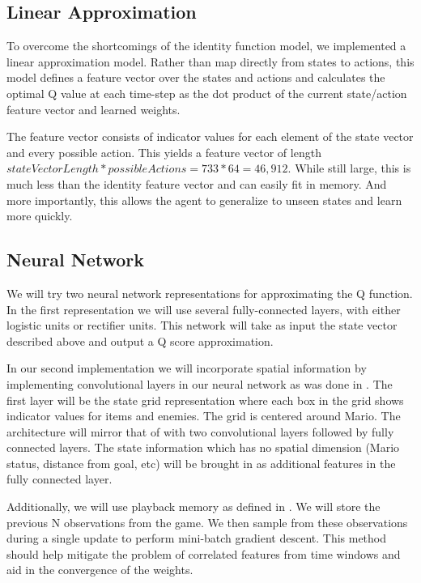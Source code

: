 \documentclass[12pt]{article}
\begin{document}
\subsection{Linear Approximation}

To overcome the shortcomings of the identity function model, we implemented a linear approximation model. Rather than map directly from states to actions, this model defines a feature vector over the states and actions and calculates the optimal Q value at each time-step as the dot product of the current state/action feature vector and learned weights. 

The feature vector consists of indicator values for each element of the state vector and every possible action. This yields a feature vector of length $stateVectorLength * possibleActions = 733 * 64 = 46,912$. While still large, this is much less than the identity feature vector and can easily fit in memory. And more importantly, this allows the agent to generalize to unseen states and learn more quickly.

\subsection{Neural Network}

We will try two neural network representations for approximating the Q function. In the first representation we will use several fully-connected layers, with either logistic units or rectifier units. This network will take as input the state vector described above and output a Q score approximation.

In our second implementation we will incorporate spatial information by implementing convolutional layers in our neural network as was done in \cite{mnih}. The first layer will be the state grid representation where each box in the grid shows indicator values for items and enemies. The grid is centered around Mario. The architecture will mirror that of \cite{mnih} with two convolutional layers followed by fully connected layers. The state information which has no spatial dimension (Mario status, distance from goal, etc) will be brought in as additional features in the fully connected layer.

Additionally, we will use playback memory as defined in \cite{mnih}. We will store the previous N observations from the game. We then sample from these observations during a single update to perform mini-batch gradient descent. This method should help mitigate the problem of correlated features from time windows and aid in the convergence of the weights.
\end{document}
